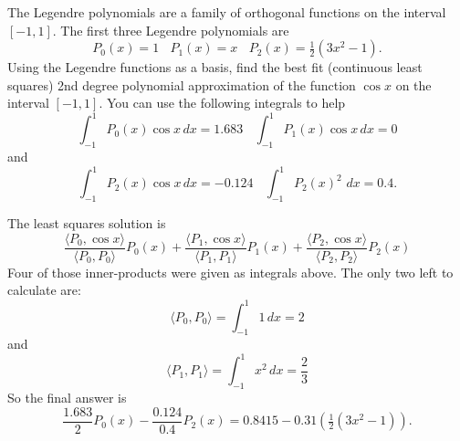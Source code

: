 \documentclass[11pt]{exam}
\newcommand{\inner}[1]{\langle {#1} \rangle}
\begin{document}
\begin{questions}
\newpage
\question The Legendre polynomials are a family of orthogonal functions on the interval $[-1,1]$.  The first three Legendre polynomials are 
$$P_0(x) = 1 ~~~~ P_1(x) = x ~~~~ P_2(x) = \tfrac{1}{2}(3x^2 - 1).$$
Using the Legendre functions as a basis, find the best fit (continuous least squares) 2nd degree polynomial approximation of the function $\cos x$ on the interval $[-1,1]$. You can use the following integrals to help
$$\int_{-1}^1 P_0(x) \cos x \,dx = 1.683 ~~~~ \int_{-1}^1 P_1(x) \cos x \,dx = 0$$
and
$$\int_{-1}^1 P_2(x) \cos x \,dx = -0.124 ~~~~ \int_{-1}^1 P_2(x)^2 \, \, dx = 0.4.$$ 
\begin{solution}
The least squares solution is 
$$\frac{\inner{P_0,\cos x}}{\inner{P_0,P_0}} P_0(x) + \frac{\inner{P_1,\cos x}}{\inner{P_1,P_1}} P_1(x) +\frac{\inner{P_2,\cos x}}{\inner{P_2,P_2}} P_2(x)$$
Four of those inner-products were given as integrals above.  The only two left to calculate are:
$$\inner{P_0,P_0} = \int_{-1}^1 1 \,dx = 2$$
and
$$\inner{P_1,P_1} = \int_{-1}^1 x^2 \,dx = \frac{2}{3}$$
So the final answer is 
$$\frac{1.683}{2} P_0(x) - \frac{0.124}{0.4} P_2(x) = 0.8415 - 0.31 \left(\tfrac{1}{2}(3x^2-1)\right).$$
\end{solution}
\vfill



\end{questions}
\end{document}
